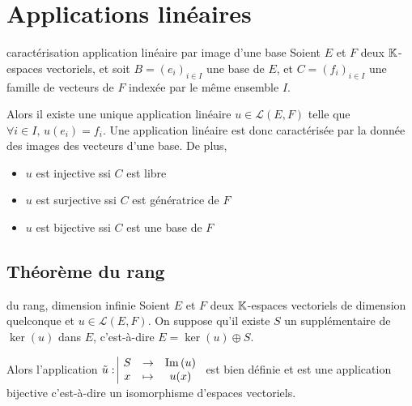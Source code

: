 \section{Applications linéaires}
\begin{theorement}{caractérisation application linéaire par image d'une base}{}
    Soient $E$ et $F$ deux $\mathbb{K}$-espaces vectoriels, et soit $B = (e_i)_{i \in I}$ une base
    de $E$, et $C = (f_i)_{i \in I}$ une famille de vecteurs de $F$ indexée par le même ensemble $I$.

    Alors il existe une unique application linéaire $u \in \mathscr L(E, F)$ telle que
    $\forall i \in I, \, u(e_i) = f_i$. Une application linéaire est donc caractérisée par la 
    donnée des images des vecteurs d'une base. 
    De plus, 

    \svspace \begin{itemize}
        \item $u$ est injective ssi $C$ est libre
        \item $u$ est surjective ssi $C$ est génératrice de $F$
        \item $u$ est bijective ssi $C$ est une base de $F$
    \end{itemize}
\end{theorement}

\subsection{Théorème du rang }

\begin{theoreme}{du rang, dimension infinie}{}
    Soient $E$ et $F$ deux $\mathbb{K}$-espaces vectoriels de dimension quelconque et $u \in \mathscr L(E, F)$.
    On suppose qu'il existe $S$ un supplémentaire de $\ker(u)$ dans $E$, c'est-à-dire
    $E = \ker(u) \oplus S$.

    Alors l'application $\tilde u: \space \begin{array}{|ccc} \displaystyle S & \to & \displaystyle \operatorname{Im} \,(u) \\ \displaystyle x & \mapsto & \displaystyle u(x) \end{array}$ est bien définie et est une 
    application bijective c'est-à-dire un isomorphisme d'espaces vectoriels.
\end{theoreme}

